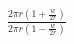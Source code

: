 \documentclass[preview]{standalone}
\begin{document}
\begin{center}
$\frac{2\pi r(1+\frac{w}{2r})}{2\pi r(1-\frac{w}{2r})}$
\end{center}
\end{document}
